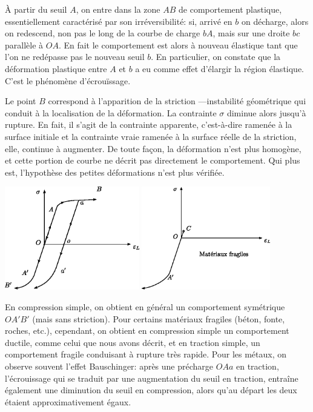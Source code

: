 \`A partir du seuil $A$, on entre dans la zone $AB$ de comportement plastique, essentiellement caractérisé par son irréversibilité: si, arrivé en $b$ on décharge, alors on redescend, non pas le long de la courbe de charge $bA$, mais sur une droite $bc$ parallèle à $OA$.
En fait le comportement est alors à nouveau élastique tant que l'on ne redépasse pas le nouveau seuil $b$.
En particulier, on constate que la déformation plastique entre $A$ et $b$ a eu comme effet d'élargir la région élastique.
C'est le phénomène d'écrouïssage.

Le point $B$ correspond à l'apparition de la striction ---instabilité géométrique qui conduit à la localisation de la déformation.
La contrainte $\sigma$ diminue alors jusqu'à rupture.
En fait, il s'agit de la contrainte apparente, c'est-à-dire ramenée à la surface initiale et la contrainte vraie ramenée à la surface réelle de la striction, elle, continue à augmenter.
De toute façon, la déformation n'est plus homogène, et cette portion de courbe ne décrit pas directement le comportement. Qui plus est, l'hypothèse des petites déformations n'est plus vérifiée.

    \begin{center}
        \includegraphics[height=4.5cm]{../images/T1_Ch04-0013}\quad\qquad
        \includegraphics[height=4.5cm]{../images/T1_Ch04-0014}
    \end{center}

En compression simple, on obtient en général un comportement symétrique $OA'B'$ (mais sans striction).
Pour certains matériaux fragiles (béton, fonte, roches, etc.), cependant, on obtient en compression simple un comportement ductile, comme celui que nous avons décrit, et en traction simple, un comportement fragile conduisant à rupture très rapide.
Pour les métaux, on observe souvent l'effet Bauschinger: après une précharge $OAa$ en traction, l'écrouissage qui se traduit par une augmentation du seuil en traction, entraîne également une diminution du seuil en compression, alors qu'au départ les deux étaient approximativement égaux.

